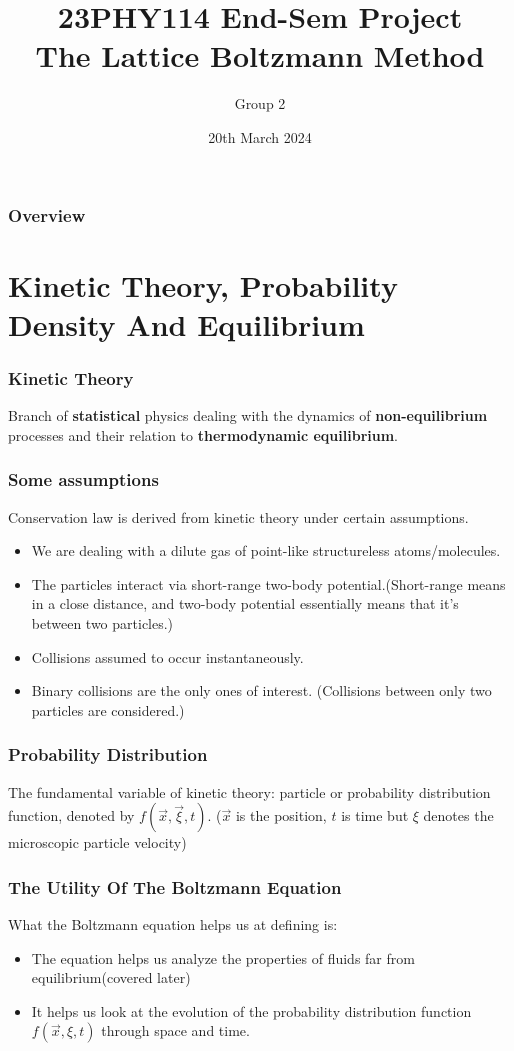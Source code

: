 \documentclass{beamer}
\title{23PHY114 End-Sem Project \\ The Lattice Boltzmann Method}
\author{Group 2}
\institute{Amrita Vishwa Vidyapeetham}
\date{20th March 2024}
\begin{document}
\maketitle
\begin{frame}
\frametitle{Overview}
\tableofcontents
\end{frame}
\section{Kinetic Theory, Probability Density And Equilibrium}
\begin{frame}

	\frametitle{Kinetic Theory}
\begin{definition}
Branch of \textbf{statistical} physics dealing with the dynamics of \textbf{non-equilibrium} processes and their relation to \textbf{thermodynamic equilibrium}.
\end{definition}

\end{frame}
\begin{frame}
\frametitle{Some assumptions}
Conservation law is derived from kinetic theory under certain assumptions.
\begin{itemize}
	\item<1-> We are dealing with a dilute gas of point-like structureless atoms/molecules.
	\item<2-> The particles interact via short-range two-body potential.(Short-range means in a close distance, and two-body potential essentially means that it's between two particles.)
	\item<3->  Collisions assumed to occur instantaneously. 
	\item<4->  Binary collisions are the only ones of interest. (Collisions between only two particles are considered.)
\end{itemize}
\end{frame}
\begin{frame}
\frametitle{Probability Distribution}
	The fundamental variable of kinetic theory: particle or probability distribution function, denoted by $f(\vec{x}, \vec{\xi}, t)$. ($\vec{x}$ is the position, $t$ is time but $\xi$ denotes the microscopic particle velocity)
\end{frame}
\begin{frame}
	\frametitle{The Utility Of The Boltzmann Equation}
	What the Boltzmann equation helps us at defining is:
\begin{itemize}
	\item<1-> The equation helps us analyze the properties of fluids far from equilibrium(covered later)
	\item<2-> It helps us look at the evolution of the probability distribution function $f(\vec{x}, \xi, t)$ through space and time.
\end{itemize}
\end{frame}
\end{document}
